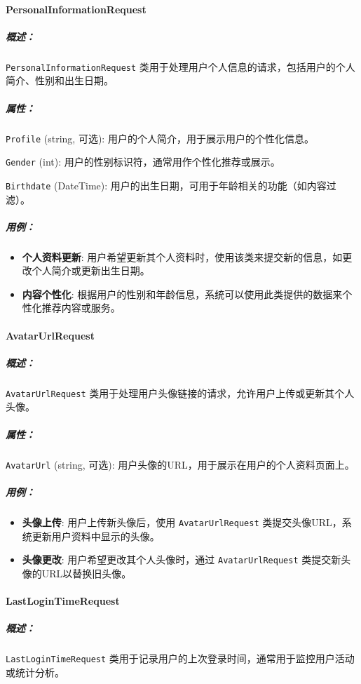 \paragraph{PersonalInformationRequest}
\subparagraph{概述：} \texttt{PersonalInformationRequest} 类用于处理用户个人信息的请求，包括用户的个人简介、性别和出生日期。

\subparagraph{属性：}

\texttt{Profile} (string, 可选): 用户的个人简介，用于展示用户的个性化信息。

\texttt{Gender} (int): 用户的性别标识符，通常用作个性化推荐或展示。

\texttt{Birthdate} (DateTime): 用户的出生日期，可用于年龄相关的功能（如内容过滤）。

\subparagraph{用例：}
\begin{itemize}
	\item \textbf{个人资料更新}: 用户希望更新其个人资料时，使用该类来提交新的信息，如更改个人简介或更新出生日期。
	\item \textbf{内容个性化}: 根据用户的性别和年龄信息，系统可以使用此类提供的数据来个性化推荐内容或服务。
\end{itemize}

\paragraph{AvatarUrlRequest}
\subparagraph{概述：} \texttt{AvatarUrlRequest} 类用于处理用户头像链接的请求，允许用户上传或更新其个人头像。

\subparagraph{属性：}

\texttt{AvatarUrl} (string, 可选): 用户头像的URL，用于展示在用户的个人资料页面上。

\subparagraph{用例：}
\begin{itemize}
	\item \textbf{头像上传}: 用户上传新头像后，使用 \texttt{AvatarUrlRequest} 类提交头像URL，系统更新用户资料中显示的头像。
	\item \textbf{头像更改}: 用户希望更改其个人头像时，通过 \texttt{AvatarUrlRequest} 类提交新头像的URL以替换旧头像。
\end{itemize}

\paragraph{LastLoginTimeRequest}
\subparagraph{概述：}\texttt{LastLoginTimeRequest} 类用于记录用户的上次登录时间，通常用于监控用户活动或统计分析。

